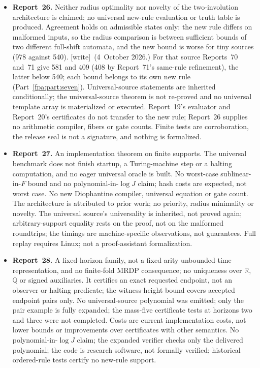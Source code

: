 \documentclass[11pt,a4paper]{article}
\numberwithin{equation}{section}
\newcommand{\wtag}{\textup{[write]}}
\begin{document}
\begin{itemize}
\item \textbf{Report~26.} Neither radius optimality nor novelty of the two-involution architecture is claimed; no universal new-rule evaluation or truth table is produced. Agreement holds on admissible states only: the new rule differs on malformed inputs, so the radius comparison is between sufficient bounds of two different full-shift automata, and the new bound is worse for tiny sources (978 against 540). \wtag\ (4~October 2026.) For that source Reports~70 and~71 give 581 and 409 (408 by Report~71's same-rule refinement), the latter below 540; each bound belongs to its own new rule (Part~\ref{fpa:part:seven}). Universal-source statements are inherited conditionally; the universal-source theorem is not re-proved and no universal template array is materialized or executed. Report~19's evaluator and Report~20's certificates do not transfer to the new rule; Report~26 supplies no arithmetic compiler, fibers or gate counts. Finite tests are corroboration, the release seal is not a signature, and nothing is formalized.
\item \textbf{Report~27.} An implementation theorem on finite supports. The universal benchmark does not finish startup, a Turing-machine step or a halting computation, and no eager universal oracle is built. No worst-case sublinear-in-$F$ bound and no polynomial-in-$\log J$ claim; hash costs are expected, not worst case. No new Diophantine compiler, universal equation or gate count. The architecture is attributed to prior work; no priority, radius minimality or novelty. The universal source's universality is inherited, not proved again; arbitrary-support equality rests on the proof, not on the malformed roundtrips; the timings are machine-specific observations, not guarantees. Full replay requires Linux; not a proof-assistant formalization.
\item \textbf{Report~28.} A fixed-horizon family, not a fixed-arity unbounded-time representation, and no finite-fold MRDP consequence; no uniqueness over $\mathbb R$, $\mathbb Q$ or signed auxiliaries. It certifies an exact requested endpoint, not an observer or halting predicate; the witness-height bound covers accepted endpoint pairs only. No universal-source polynomial was emitted; only the pair example is fully expanded; the mass-five certificate tests at horizons two and three were not completed. Costs are current implementation costs, not lower bounds or improvements over certificates with other semantics. No polynomial-in-$\log J$ claim; the expanded verifier checks only the delivered polynomial; the code is research software, not formally verified; historical ordered-rule tests certify no new-rule support.

\end{itemize}
\end{document}
